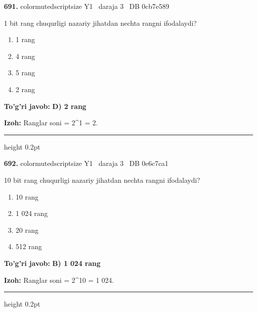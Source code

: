 \documentclass[10pt,a4paper,oneside]{article}
\begin{document}
\noindent\textbf{\color{ink}691.}  {color{muted}scriptsize Y1 \textbullet\ daraja 3 \textbullet\ DB 0cb7e589}
\par
1 bit rang chuqurligi nazariy jihatdan nechta rangni ifodalaydi?
\begin{enumerate}[label=\Alph*),leftmargin=9mm]
\item 1 rang
\item 4 rang
\item 5 rang
\item 2 rang
\end{enumerate}
\begin{tcolorbox}[enhanced,breakable,colback=teal!4,colframe=teal!50!black,boxrule=0.5pt,arc=1.1mm,left=3mm,right=3mm,top=1.7mm,bottom=1.7mm,before skip=2mm,after skip=2mm]
\textbf{\color{teal}To'g'ri javob:} \textbf{D) 2 rang}
\par\smallskip
\textbf{Izoh:} Ranglar soni = 2\textasciicircum{}1 = 2.
\end{tcolorbox}
\vspace{2mm}\hrule height 0.2pt \vspace{3mm}

\noindent\textbf{\color{ink}692.}  {color{muted}scriptsize Y1 \textbullet\ daraja 3 \textbullet\ DB 0e6c7ca1}
\par
10 bit rang chuqurligi nazariy jihatdan nechta rangni ifodalaydi?
\begin{enumerate}[label=\Alph*),leftmargin=9mm]
\item 10 rang
\item 1 024 rang
\item 20 rang
\item 512 rang
\end{enumerate}
\begin{tcolorbox}[enhanced,breakable,colback=teal!4,colframe=teal!50!black,boxrule=0.5pt,arc=1.1mm,left=3mm,right=3mm,top=1.7mm,bottom=1.7mm,before skip=2mm,after skip=2mm]
\textbf{\color{teal}To'g'ri javob:} \textbf{B) 1 024 rang}
\par\smallskip
\textbf{Izoh:} Ranglar soni = 2\textasciicircum{}10 = 1 024.
\end{tcolorbox}
\vspace{2mm}\hrule height 0.2pt \vspace{3mm}
\end{document}
